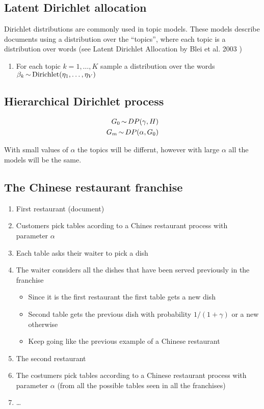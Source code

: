 \subsection{Latent Dirichlet allocation}

Dirichlet distributions are commonly used in topic models. These models
describe documents using a distribution over the ``topics'', where each topic
is a distribution over words (see Latent Dirichlet Allocation by Blei et al.
2003 \cite{blei2003latent})

\begin{enumerate}
  \item For each topic $k = 1, \dots, K$ sample a distribution over the words
    $\beta_k \operatorname*{\sim} \text{Dirichlet}(\eta_1, \dots, \eta_V)$
\end{enumerate}

\subsection{Hierarchical Dirichlet process}

\begin{align}
  G_0 \operatorname*{\sim} DP(\gamma, H) \\
  G_m \operatorname*{\sim} DP(\alpha, G_0)
\end{align}

With small values of $\alpha$ the topics will be differnt, however with large
$\alpha$ all the models will be the same.

\subsection{The Chinese restaurant franchise}

\begin{enumerate}
  \item First restaurant (document)
    \item Customers pick tables acording to a Chines restaurant process with
      parameter $\alpha$
    \item Each table asks their waiter to pick a dish
    \item The waiter considers all the dishes that have been served previously
      in the franchise
\begin{itemize}
  \item Since it is the first restaurant the first table gets a new dish
  \item Second table gets the previous dish with probability $1/(1+\gamma)$ or
    a new otherwise
    \item Keep going like the previous example of a Chinese restaurant
\end{itemize}
  \item The second restaurant
  \item The costumers pick tables according to a Chinese restaurant process
    with parameter $\alpha$ (from all the possible tables seen in all the
    franchises)
  \item \dots
\end{enumerate}

